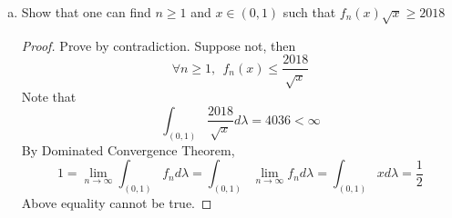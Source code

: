 \begin{itemize}
\begin{enumerate}[(a)]
		\item Show that one can find $n \ge 1$ and $x \in (0, 1)$ such that  $f_n(x)\sqrt{x} \ge 2018$
		\begin{proof}
			Prove by contradiction. Suppose not, then 
			$$
			\forall n\ge 1,~~ f_n(x)\le \frac{2018}{\sqrt{x}}
			$$
			Note that 
			$$
			\int_{(0,1)} \frac{2018}{\sqrt{x}} d\lambda = 4036 < \infty
			$$
			By Dominated Convergence Theorem, 
			$$
			1 = \lim_{n\rightarrow \infty} \int_{(0,1)} f_n d\lambda = \int_{(0,1)} \lim_{n\rightarrow \infty} f_n d\lambda = \int_{(0,1)} x d\lambda = \frac{1}{2}
			$$
			Above equality cannot be true. 
		\end{proof}
	\end{enumerate}

\end{itemize}